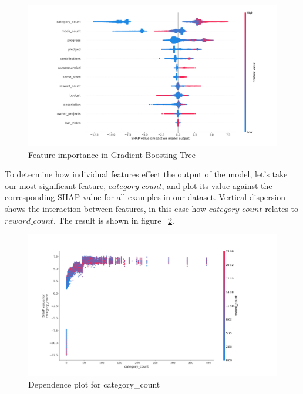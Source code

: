 \documentclass[cic,tc,english]{iiufrgs}
\begin{document}
\begin{figure}
    \caption{Feature importance in Gradient Boosting Tree}
    \begin{center}
        \includegraphics[width=\textwidth]{feature_contribution}
    \end{center}
    \label{fig:features_importance}
\end{figure}

To determine how individual features effect the output of the model, let's take our most significant feature, $category\_count$, and plot its value against the corresponding SHAP value for all examples in our dataset. Vertical dispersion shows the interaction between features, in this case how $category\_count$ relates to $reward\_count$. The result is shown in figure ~\ref{fig:category_count}.

\begin{figure}
    \caption{Dependence plot for category\_count}
    \begin{center}
        \includegraphics[width=\textwidth]{category_count}
    \end{center}
    \label{fig:category_count}
\end{figure}
\end{document}
